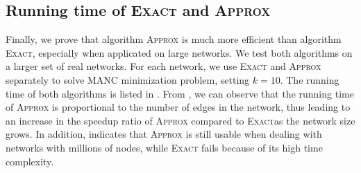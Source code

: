 \documentclass[sigconf]{acmart}
\begin{document}
\subsection{Running time of \textsc{Exact} and \textsc{Approx}}

Finally, we prove that algorithm \textsc{Approx} is much more efficient than algorithm \textsc{Exact}, especially when applicated on large networks.
We test both algorithms on a larger set of real networks.
For each network, we use \textsc{Exact} and \textsc{Approx} separately to solve MANC minimization problem, setting \(k=10\).
The running time of both algorithms is listed in .
From , we can observe that the running time of \textsc{Approx} is proportional to the number of edges in the network, thus leading to an increase in the speedup ratio of \textsc{Approx} compared to \textsc{Exact}as the network size grows.
In addition,  indicates that \textsc{Approx} is still usable when dealing with networks with millions of nodes, while \textsc{Exact} fails because of its high time complexity.
\end{document}

